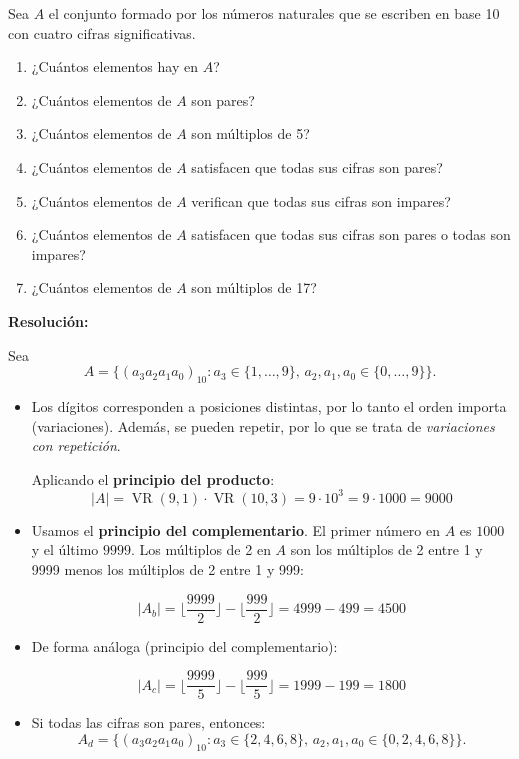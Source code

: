 \documentclass[a4paper,12pt]{article}
\begin{document}
\begin{ejercicio}[title=Ejercicio 2]
Sea \( A \) el conjunto formado por los números naturales que se escriben en base 10 con cuatro cifras significativas.

\begin{enumerate}
\item[a)] ¿Cuántos elementos hay en \( A \)?
\item[b)] ¿Cuántos elementos de \( A \) son pares?
\item[c)] ¿Cuántos elementos de \( A \) son múltiplos de 5?
\item[d)] ¿Cuántos elementos de \( A \) satisfacen que todas sus cifras son pares?
\item[e)] ¿Cuántos elementos de \( A \) verifican que todas sus cifras son impares?
\item[f)] ¿Cuántos elementos de \( A \) satisfacen que todas sus cifras son pares o todas son impares?
\item[g)] ¿Cuántos elementos de \( A \) son múltiplos de 17?
\end{enumerate}

\tcblower
\textbf{Resolución:}

Sea 
\[
A = \{ (a_3a_2a_1a_0)_{10} : a_3 \in \{1,\ldots,9\}, \, a_2,a_1,a_0 \in \{0,\ldots,9\} \}.
\]

\begin{itemize}
\item[\textbf{a)}] 
Los dígitos corresponden a posiciones distintas, por lo tanto el orden importa (variaciones).  
Además, se pueden repetir, por lo que se trata de \textit{variaciones con repetición}.  

Aplicando el \textbf{principio del producto}:
\[
|A| = \operatorname{VR}(9,1) \cdot \operatorname{VR}(10,3) = 9 \cdot 10^3 = 9 \cdot 1000 = \boxed{9000}
\]

\item[\textbf{b)}]
Usamos el \textbf{principio del complementario}.  
El primer número en \( A \) es \( 1000 \) y el último \( 9999 \).  
Los múltiplos de 2 en \( A \) son los múltiplos de 2 entre 1 y 9999 menos los múltiplos de 2 entre 1 y 999:

\[
|A_b| = \bigg\lfloor \frac{9999}{2} \bigg\rfloor - \bigg\lfloor \frac{999}{2} \bigg\rfloor = 4999 - 499 = \boxed{4500}
\]

\item[\textbf{c)}]
De forma análoga (principio del complementario):

\[
|A_c| = \bigg\lfloor \frac{9999}{5} \bigg\rfloor - \bigg\lfloor \frac{999}{5} \bigg\rfloor = 1999 - 199 = \boxed{1800}
\]

\item[\textbf{d)}]
Si todas las cifras son pares, entonces:
\[
A_d = \{ (a_3a_2a_1a_0)_{10} : a_3 \in \{2,4,6,8\}, \, a_2,a_1,a_0 \in \{0,2,4,6,8\} \}.
\]

\end{itemize}
\end{ejercicio}
\end{document}
